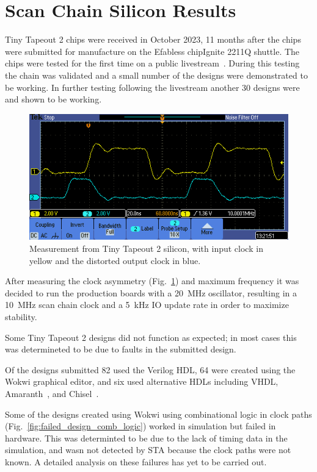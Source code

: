 \section{Scan Chain Silicon Results}
\label{sec:scan_chain_res}

Tiny Tapeout 2 chips were received in October 2023, 11 months after the chips were submitted for manufacture on the Efabless chipIgnite 2211Q shuttle.
The chips were tested for the first time on a public livestream~\cite{siliconalive}.
During this testing the chain was validated and a small number of the designs were demonstrated to be working.
In further testing following the livestream another 30 designs were and shown to be working.

\begin{figure}[!t]
\centering
\includegraphics[width=\columnwidth]{./Figs/tt02_clock_out.png}
\caption{Measurement from Tiny Tapeout 2 silicon, with input clock in yellow and the distorted output clock in blue.}
\label{fig:TT02_clock_out}
\end{figure}

After measuring the clock asymmetry (Fig.~\ref{fig:TT02_clock_out}) and maximum frequency it was decided to run the production boards with a \qty{20}{\MHz} oscillator, resulting in a \qty{10}{\MHz} scan chain clock and a \qty{5}{\kHz} IO update rate in order to maximize stability.

Some Tiny Tapeout 2 designs did not function as expected; in most cases this was determineted to be due to faults in the submitted design.

Of the designs submitted 82 used the Verilog HDL, 64 were created using the Wokwi graphical editor, and six used alternative HDLs including VHDL, Amaranth~\cite{amaranth}, and Chisel~\cite{chisel}.

Some of the designs created using Wokwi using combinational logic in clock paths (Fig.~\ref{fig:failed_design_comb_logic}) worked in simulation but failed in hardware.
This was determinted to be due to the lack of timing data in the simulation, and wasn not detected by STA because the clock paths were not known. A detailed analysis on these failures has yet to be carried out.

